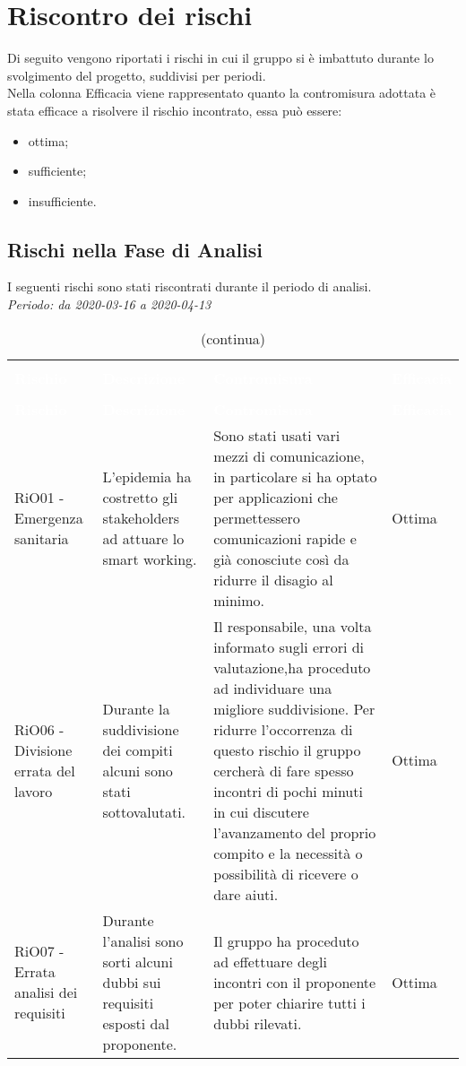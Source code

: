 \section{Riscontro dei rischi}
Di seguito vengono riportati i rischi in cui il gruppo si è imbattuto durante lo svolgimento del progetto, suddivisi per periodi. \\
Nella colonna Efficacia viene rappresentato quanto la contromisura adottata è stata efficace a risolvere il rischio incontrato, essa può essere:
\begin{itemize}
	\item ottima;
	\item sufficiente;
	\item insufficiente.
\end{itemize}

\subsection{Rischi nella Fase di Analisi}
I seguenti rischi sono stati riscontrati durante il periodo di analisi. \\
\textit{Periodo: da 2020-03-16 a 2020-04-13}

\begin{longtable}{C{3cm} L{4.5cm} L{5.5cm} C{2cm}}
\caption{Attualizzazione dei rischi - Analisi} \\
\textcolor{white}{\textbf{Rischio}} &
\textcolor{white}{\textbf{Descrizione}} &
\textcolor{white}{\textbf{Contromisura}} &
\textcolor{white}{\textbf{Efficacia}}\\
		\endfirsthead
		\caption[]{(continua)} \\
\textcolor{white}{\textbf{Rischio}} &
\textcolor{white}{\textbf{Descrizione}} &
\textcolor{white}{\textbf{Contromisura}} &
\textcolor{white}{\textbf{Efficacia}}\\
		\endhead

RiO01 - Emergenza sanitaria	& L'epidemia ha costretto gli stakeholders ad attuare lo smart working. & Sono stati usati vari mezzi di comunicazione, in particolare si ha optato per applicazioni che permettessero comunicazioni rapide e già conosciute così da ridurre il disagio al minimo. & Ottima
\\
RiO06 - Divisione errata del lavoro & Durante la suddivisione dei compiti alcuni sono stati sottovalutati. & Il responsabile, una volta informato sugli errori di valutazione,ha proceduto ad individuare una migliore suddivisione. Per ridurre l'occorrenza di questo rischio il gruppo cercherà di fare spesso incontri di pochi minuti in cui discutere l'avanzamento del proprio compito e la necessità o possibilità di ricevere o dare aiuti. & Ottima
\\
RiO07 - Errata analisi dei requisiti & Durante l'analisi sono sorti alcuni dubbi sui requisiti esposti dal proponente. & Il gruppo ha proceduto ad effettuare degli incontri con il proponente per poter chiarire tutti i dubbi rilevati. & Ottima
\\

\end{longtable}



